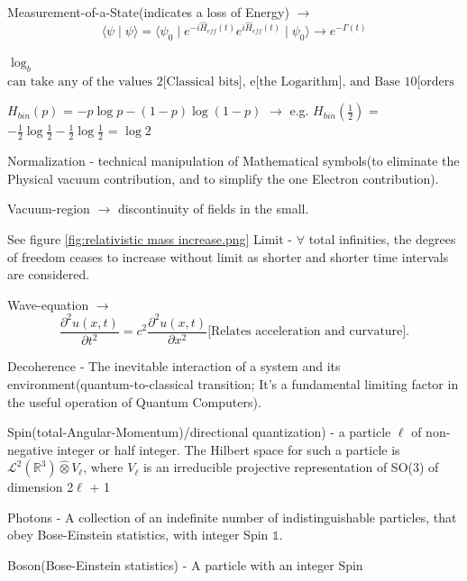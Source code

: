 \documentclass[a4paper, 10pt, onepage]{elegantbook}
\begin{document}
{Measurement-of-a-State(indicates a loss of Energy) $\longrightarrow$
\begin{equation}
\langle \psi \mid \psi \rangle = \langle \psi_0 \mid e^{- i \hat H_{eff}(t)} e^{i \hat H_{eff}(t)} \mid \psi_0 \rangle 
\rightarrow e^{- \Gamma(t)}
\end{equation}
\noindent

$\log_b$ $\text{can take any of the values 2[Classical bits], e[the  Logarithm], and Base 10[orders of 
magnitude]}$

$H_{bin}(p)$ = $ -p \log p - (1 - p) \log (1 - p)$ $\rightarrow$ e.g. $H_{bin}(\frac{1}{2})$ = $ - \frac{1}{2} \log 
\frac{1}{2} - \frac{1}{2} \log \frac{1}{2}$ = $\log 2$

Normalization - technical manipulation of Mathematical symbols(to
eliminate the Physical vacuum contribution, and to simplify the one Electron contribution).
 
Vacuum-region $\rightarrow$ discontinuity of fields in the small.

See figure \ref{fig:relativistic mass increase.png} \quad Limit - $\forall$ total infinities, the degrees 
of freedom ceases to increase
without limit as shorter and shorter time intervals are considered.

Wave-equation $\longrightarrow$
\begin{equation}
\frac{\partial^2u(x,t)}{\partial t^2} = c^2 \frac{\partial^2 u(x,t)}{\partial x^2}  \text{[Relates acceleration and 
curvature].}
\end{equation}
  
Decoherence - The inevitable interaction of a system and its environment(quantum-to-classical transition;
It's a fundamental limiting factor in the useful operation of Quantum Computers).
                                                                         
Spin(total-Angular-Momentum)/directional quantization) - a particle $\ell$ of 
non-negative integer or half integer.
The Hilbert space for such a particle is
$\mathscr L^2(\mathbb R^3) \hat \otimes V_{\ell}$, where $V_{\ell}$ is an irreducible projective representation of SO(3)
of dimension 2$\ell$ + 1

Photons - A collection of an indefinite number of indistinguishable particles, that obey Bose-Einstein statistics, with 
integer Spin $\mathbb 1$.

Boson(Bose-Einstein statistics) - A particle with an integer Spin

}
\end{document}
